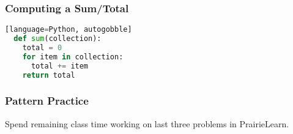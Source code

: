 \documentclass{beamer}
\begin{document}
%
%
\begin{frame}[fragile]
  \frametitle{Computing a Sum/Total}
  \begin{lstlisting}[language=Python, autogobble][language=Python, autogobble]
  def sum(collection):
    total = 0
    for item in collection:
      total += item
    return total
  \end{lstlisting}
\end{frame}


%
%
\begin{frame}[fragile]
  \frametitle{Pattern Practice}
  Spend remaining class time working on last three problems in PrairieLearn.
\end{frame}
\end{document}
